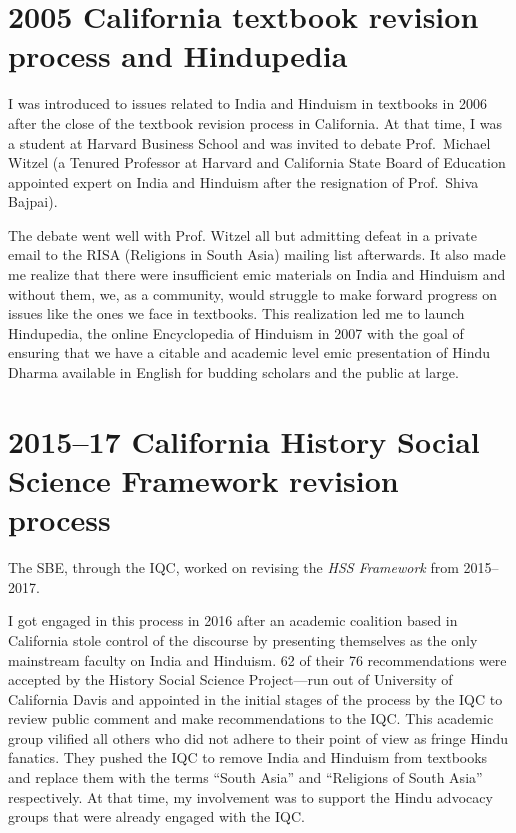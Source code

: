 \section*{2005 California textbook revision process and Hindupedia}

I was introduced to issues related to India and Hinduism in textbooks in 2006 after the close of the textbook revision process in California. At that time, I was a student at Harvard Business School and was invited to debate Prof.\ Michael Witzel (a Tenured Professor at Harvard and California State Board of Education appointed expert on India and Hinduism after the resignation of Prof.\ Shiva Bajpai).

The debate went well with Prof. Witzel all but admitting defeat in a private email to the RISA (Religions in South Asia) mailing list afterwards. It also made me realize that there were insufficient emic materials on India and Hinduism and without them, we, as a community, would struggle to make forward progress on issues like the ones we face in textbooks. This realization led me to launch Hindupedia, the online Encyclopedia of Hinduism in 2007 with the goal of ensuring that we have a citable and academic level emic presentation of Hindu Dharma available in English for budding scholars and the public at large. 

\section*{2015--17 California History Social Science Framework revision process}

The SBE, through the IQC, worked on revising the \textit{HSS Framework} from 2015--2017.

I got engaged in this process in 2016 after an academic coalition based in California stole control of the discourse by presenting themselves as the only mainstream faculty on India and Hinduism. 62 of their 76 recommendations were accepted by the History Social Science Project—run out of University of California Davis and appointed in the initial stages of the process by the IQC to review public comment and make recommendations to the IQC. This academic group vilified all others who did not adhere to their point of view as fringe Hindu fanatics. They pushed the IQC to remove India and Hinduism from textbooks and replace them with the terms “South Asia” and “Religions of South Asia” respectively. At that time, my involvement was to support the Hindu advocacy groups that were already engaged with the IQC. 


